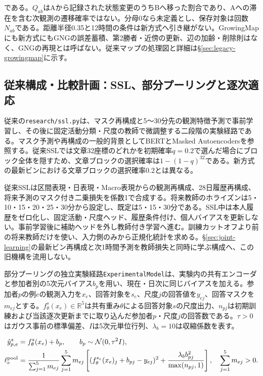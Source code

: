 である。\(Q_{ab}\)はAから記録された状態変更のうちBへ移った割合であり、Aへの滞在を含む次観測の遷移確率ではない。分母0なら未定義とし、保存対象は回数\(N_{ab}\)である。距離半径0.35と12時間の条件は新方式へ引き継がない。GrowingMapにも新方式にもGNGの誤差蓄積、第2勝者・近傍の更新、辺の加齢・削除則はなく、GNGの再現とは呼ばない\autocite{fritzke1995gng}。従来マップの処理図と詳細は§\ref{sec:legacy-growingmap}に示す。

\subsection{従来構成・比較計画：SSL、部分プーリングと逐次適応}
\label{sec:legacy-ssl-and-adaptation}

従来の\texttt{research/ssl.py}は、マスク再構成と5〜30分先の観測特徴予測で事前学習し、その後に固定活動分類・尺度の教師で微調整する二段階の実験経路である。マスク予測や再構成の一般的背景としてBERTとMasked Autoencodersを参照する\autocite{devlin2019bert,he2022mae}。従来SSLでは文章32座標のどれかを初期確率\(q=0.2\)で選んだ場合にブロック全体を隠すため、文章ブロックの選択確率は\(1-(1-q)^{32}\)である。新方式の最新ビンにおける文章ブロックの選択確率0.2とは異なる。

従来SSLは区間表現・日表現・Macro表現からの観測再構成、28日履歴再構成、将来予測のマスク付き二乗損失を係数1で合成する。将来教師のホライズンは5・10・15・20・25・30分から設定し、既定は5・15・30分である。SSL中は本人履歴をゼロ化し、固定活動・尺度ヘッド、履歴条件付け、個人バイアスを更新しない。事前学習後に補助ヘッドを外し教師付き学習へ進む。訓練カットオフより前の将来教師だけを使い、入力側のみから正規化統計を求める。§\ref{sec:joint-learning}の最新ビン再構成と次1時間予測を教師損失と同時に学ぶ構成へ、この旧機構を流用しない。

部分プーリングの独立実験経路\texttt{ExperimentalModel}は、実験内の共有エンコーダと参加者別の5次元バイアス\(b_p\)を用い、現在・日次に同じバイアスを加える\autocite{gelman2007multilevel}。参加者\(p\)の例\(e\)の観測入力を\(x_e\)、回答対象を\(s_e\)、尺度\(j\)の回答値を\(y_{ej}\)、回答マスクを\(m_{ej}\)とする。\(f_\theta^s(x_e)\in\mathbb R^5\)は共有重み\(\theta\)による回答対象\(s\)の尺度出力、\(n_{pj}\)は初期訓練および当該逐次更新までに取り込んだ参加者\(p\)・尺度\(j\)の回答数である。\(\tau>0\)はガウス事前の標準偏差、\(I\)は5次元単位行列、\(\lambda_b=10\)は収縮係数を表す。

\[
\begin{aligned}
\hat y_{p,e}^{s}&=f_\theta^{s}(x_e)+b_p,\qquad
b_p\sim\mathcal N(0,\tau^2I),\\
\ell_e^{\rm pool}
&=\frac1{\sum_{j=1}^5m_{ej}}
\sum_{j=1}^5m_{ej}
\left[
(f_\theta^{s_e}(x_e)_j+b_{pj}-y_{ej})^2+
\frac{\lambda_b b_{pj}^2}{\max(n_{pj},1)}
\right],
\quad \sum_{j=1}^5m_{ej}>0.
\end{aligned}
\]


